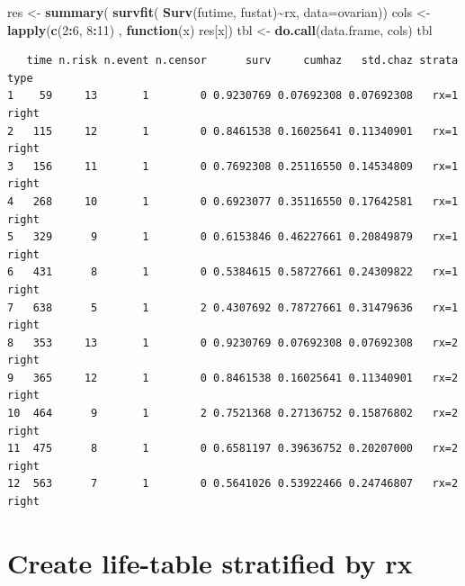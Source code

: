\documentclass[
]{article}
\newenvironment{Shaded}{\begin{snugshade}}{\end{snugshade}}
\newcommand{\AttributeTok}[1]{\textcolor[rgb]{0.13,0.29,0.53}{#1}}
\newcommand{\ControlFlowTok}[1]{\textcolor[rgb]{0.13,0.29,0.53}{\textbf{#1}}}
\newcommand{\DecValTok}[1]{\textcolor[rgb]{0.00,0.00,0.81}{#1}}
\newcommand{\FunctionTok}[1]{\textcolor[rgb]{0.13,0.29,0.53}{\textbf{#1}}}
\newcommand{\NormalTok}[1]{#1}
\newcommand{\OtherTok}[1]{\textcolor[rgb]{0.56,0.35,0.01}{#1}}
\newcommand{\SpecialCharTok}[1]{\textcolor[rgb]{0.81,0.36,0.00}{\textbf{#1}}}
\begin{document}
\begin{Shaded}
\begin{Highlighting}[]
\NormalTok{res }\OtherTok{\textless{}{-}} \FunctionTok{summary}\NormalTok{( }\FunctionTok{survfit}\NormalTok{( }\FunctionTok{Surv}\NormalTok{(futime, fustat)}\SpecialCharTok{\textasciitilde{}}\NormalTok{rx, }\AttributeTok{data=}\NormalTok{ovarian))}
\NormalTok{cols }\OtherTok{\textless{}{-}} \FunctionTok{lapply}\NormalTok{(}\FunctionTok{c}\NormalTok{(}\DecValTok{2}\SpecialCharTok{:}\DecValTok{6}\NormalTok{, }\DecValTok{8}\SpecialCharTok{:}\DecValTok{11}\NormalTok{) , }\ControlFlowTok{function}\NormalTok{(x) res[x])}
\NormalTok{tbl }\OtherTok{\textless{}{-}} \FunctionTok{do.call}\NormalTok{(data.frame, cols)}
\NormalTok{tbl}
\end{Highlighting}
\end{Shaded}

\begin{verbatim}
   time n.risk n.event n.censor      surv     cumhaz   std.chaz strata  type
1    59     13       1        0 0.9230769 0.07692308 0.07692308   rx=1 right
2   115     12       1        0 0.8461538 0.16025641 0.11340901   rx=1 right
3   156     11       1        0 0.7692308 0.25116550 0.14534809   rx=1 right
4   268     10       1        0 0.6923077 0.35116550 0.17642581   rx=1 right
5   329      9       1        0 0.6153846 0.46227661 0.20849879   rx=1 right
6   431      8       1        0 0.5384615 0.58727661 0.24309822   rx=1 right
7   638      5       1        2 0.4307692 0.78727661 0.31479636   rx=1 right
8   353     13       1        0 0.9230769 0.07692308 0.07692308   rx=2 right
9   365     12       1        0 0.8461538 0.16025641 0.11340901   rx=2 right
10  464      9       1        2 0.7521368 0.27136752 0.15876802   rx=2 right
11  475      8       1        0 0.6581197 0.39636752 0.20207000   rx=2 right
12  563      7       1        0 0.5641026 0.53922466 0.24746807   rx=2 right
\end{verbatim}

\hypertarget{create-life-table-stratified-by-rx}{%
\section{Create life-table stratified by
rx}\label{create-life-table-stratified-by-rx}}
\end{document}
